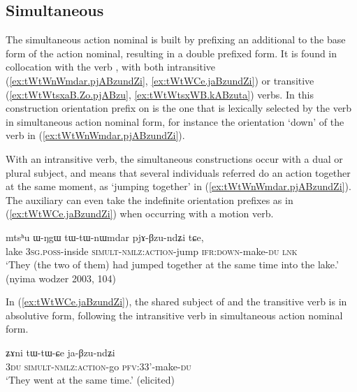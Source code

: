 \subsection{Simultaneous} 
The simultaneous action nominal is built by prefixing an additional  to the base form of the action nominal, resulting in a double  prefixed form. It is found in collocation with the verb , with both intransitive (\ref{ex:tWtWnWmdar.pjABzundZi}, \ref{ex:tWtWCe.jaBzundZi}) or transitive (\ref{ex:tWtWtsxaB.Zo.pjABzu}, \ref{ex:tWtWtsxWB.kABzuta}) verbs. In this construction orientation prefix on  is the one that is lexically selected by the verb in simultaneous action nominal form, for instance the orientation `down'  of the verb  in (\ref{ex:tWtWnWmdar.pjABzundZi}).


With an intransitive verb, the simultaneous constructions occur with a dual or plural subject, and means that several individuals referred do an action together at the same moment, as  `jumping together' in (\ref{ex:tWtWnWmdar.pjABzundZi}). The auxiliary  can even take the indefinite orientation prefixes   as in (\ref{ex:tWtWCe.jaBzundZi}) when occurring with a motion verb.

\begin{exe}
\ex \label{ex:tWtWnWmdar.pjABzundZi}
\gll  mtsʰu ɯ-ŋgɯ tɯ-tɯ-nɯmdar pjɤ-βzu-ndʑi tɕe, \\
 lake \textsc{3sg}.\textsc{poss}-inside \textsc{simult}-\textsc{nmlz}:\textsc{action}-jump \textsc{ifr}:\textsc{down}-make-\textsc{du} \textsc{lnk} \\
 \glt `They (the two of them) had jumped together at the same time into the lake.' (nyima wodzer 2003, 104)
\end{exe}

In (\ref{ex:tWtWCe.jaBzundZi}), the shared subject of  and the transitive verb  is in absolutive form, following the intransitive verb in simultaneous action nominal form.

\begin{exe}
\ex \label{ex:tWtWCe.jaBzundZi}
\gll ʑɤni tɯ-tɯ-ɕe ja-βzu-ndʑi \\
\textsc{3du} \textsc{simult}-\textsc{nmlz}:\textsc{action}-go \textsc{pfv}:3\fl{}3'-make-\textsc{du} \\
\glt `They went at the same time.' (elicited)
 \end{exe}

